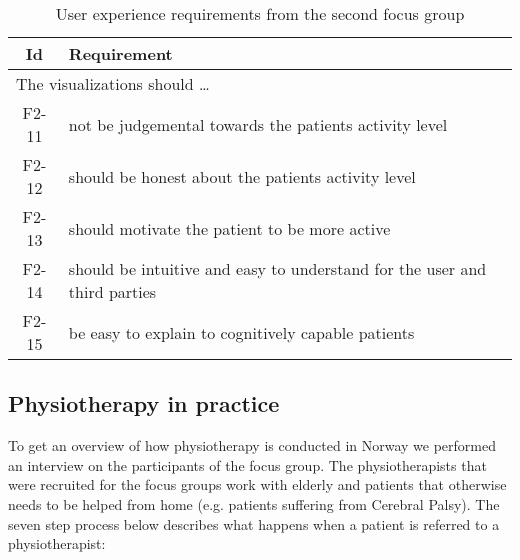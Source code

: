\begin{table}[h!]
  \begin{center}
  \begin{tabular}{|c|p{12cm}|}
    \hline
      \textbf{Id} & \textbf{Requirement} \\ \hline
    \multicolumn{2}{|l|}{The visualizations should \ldots} \\ \hline
      F2-11 & not be judgemental towards the patients activity level \\ \hline
      F2-12 & should be honest about the patients activity level \\ \hline
      F2-13 & should motivate the patient to be more active \\ \hline
      F2-14 & should be intuitive and easy to understand for the user and third parties \\ \hline
      F2-15 & be easy to explain to cognitively capable patients \\ \hline
      
  \end{tabular}
  \end{center}
  \caption{User experience requirements from the second focus group}
\end{table}

\subsection{Physiotherapy in practice} 
\label{sec:physiotherapyPractice}
To get an overview of how physiotherapy is conducted in Norway we performed an interview on the participants of the focus group. The physiotherapists that were recruited for the focus groups work with elderly and patients that otherwise needs to be helped from home (e.g. patients suffering from Cerebral Palsy). The seven step process below describes what happens when a patient is referred to a physiotherapist:

